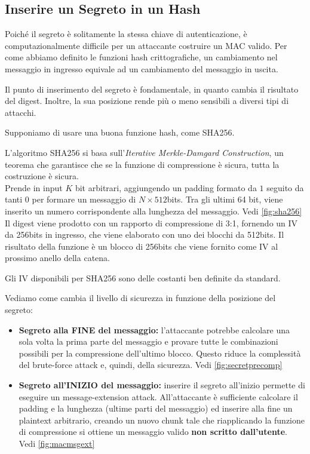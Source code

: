 \subsection{Inserire un Segreto in un Hash}\label{sub:secretpos}
Poiché il segreto è solitamente la stessa chiave di autenticazione, è computazionalmente difficile per un attaccante costruire un MAC valido. Per come abbiamo definito le funzioni hash crittografiche, un cambiamento nel messaggio in ingresso equivale ad un cambiamento del messaggio in uscita.
\begin{remark}
Il punto di inserimento del segreto è fondamentale, in quanto cambia il risultato del digest. Inoltre, la sua posizione rende più o meno sensibili a diversi tipi di attacchi.
\end{remark}
Supponiamo di usare una buona funzione hash, come SHA256.
\begin{definition}[SHA256]
L'algoritmo SHA256 si basa sull'\textit{Iterative Merkle-Damgard Construction}, un teorema che garantisce che se la funzione di compressione è sicura, tutta la costruzione è sicura.\\
Prende in input $K$ bit arbitrari, aggiungendo un padding formato da $1$ seguito da tanti $0$ per formare un messaggio di $N\times512$bits. Tra gli ultimi 64 bit, viene inserito un numero corrispondente alla lunghezza del messaggio. Vedi \cref{fig:sha256}\\
Il digest viene prodotto con un rapporto di compressione di 3:1, fornendo un IV da 256bits in ingresso, che viene elaborato con uno dei blocchi da 512bits. Il risultato della funzione è un blocco di 256bits che viene fornito come IV al prossimo anello della catena.
\end{definition}
\begin{remark}Gli IV disponibili per SHA256 sono delle costanti ben definite da standard.\end{remark}
Vediamo come cambia il livello di sicurezza in funzione della posizione del segreto:
\begin{itemize}
    \item \textbf{Segreto alla FINE del messaggio:} l'attaccante potrebbe calcolare una sola volta la prima parte del messaggio e provare tutte le combinazioni possibili per la compressione dell'ultimo blocco. Questo riduce la complessità del brute-force attack e, quindi, della sicurezza. Vedi \cref{fig:secretprecomp}
    \item \textbf{Segreto all'INIZIO del messaggio:} inserire il segreto all'inizio permette di eseguire un message-extension attack. All'attaccante è sufficiente calcolare il padding e la lunghezza (ultime parti del messaggio) ed inserire alla fine un plaintext arbitrario, creando un nuovo chunk tale che riapplicando la funzione di compressione si ottiene un messaggio valido \textbf{non scritto dall'utente}. Vedi \cref{fig:macmsgext}
\end{itemize}
